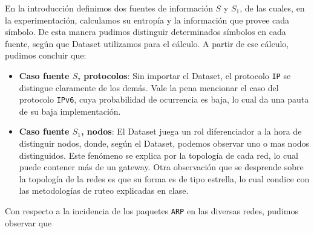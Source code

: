 En la introducción definimos dos fuentes de información $S$ y $S_{1}$, de las cuales, en la experimentación, calculamos su entropía y la información que provee cada símbolo. De esta manera pudimos distinguir determinados símbolos en cada fuente, según que Dataset utilizamos para el cálculo. A partir de ese cálculo, pudimos concluir que:
\begin{itemize}
  \item \textbf{Caso fuente $S$, protocolos}: Sin importar el Dataset, el protocolo \texttt{IP} se distingue claramente de los demás. Vale la pena mencionar el caso del protocolo \texttt{IPv6}, cuya probabilidad de ocurrencia es baja, lo cual da una pauta de su baja implementación.
  \item \textbf{Caso fuente $S_{1}$, nodos}: El Dataset juega un rol diferenciador a la hora de distinguir nodos, donde, según el Dataset, podemos observar uno o mas nodos distinguidos. Este fenómeno se explica por la topología de cada red, lo cual puede contener más de un gateway.
  Otra observación que se desprende sobre la topología de la redes es que su forma es de tipo estrella, lo cual condice con las metodologías de ruteo explicadas en clase.
\end{itemize}

Con respecto a la incidencia de los paquetes \texttt{ARP} en las diversas redes, pudimos observar que 
